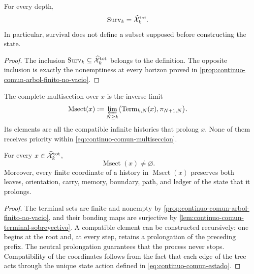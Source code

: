 \begin{theorem}
\label{thm:continuo-comun-total-superviviente}
For every depth,
\begin{equation}
\label{eq:continuo-comun-surv-igual-total}
 \operatorname{Surv}_k=\widehat{\mathcal X}^{\rm tot}_k.
\end{equation}
In particular, survival does not define a subset supposed before constructing the state.
\end{theorem}

\begin{proof}
The inclusion \(\operatorname{Surv}_k\subseteq
\widehat{\mathcal X}^{\rm tot}_k\) belongs to the definition.  The opposite
inclusion is exactly the nonemptiness at every horizon proved in
\cref{prop:continuo-comun-arbol-finito-no-vacio}.
\end{proof}

\begin{definition}
\label{def:continuo-comun-multiseccion}
The complete multisection over \(x\) is the inverse limit
\begin{equation}
\label{eq:continuo-comun-multiseccion}
 \operatorname{Msect}(x)
 :=\varprojlim_{N\geq k}
 \bigl(\operatorname{Term}_{k,N}(x),\pi_{N+1,N}\bigr).
\end{equation}
Its elements are all the compatible infinite histories that prolong
\(x\).  None of them receives priority within
\eqref{eq:continuo-comun-multiseccion}.
\end{definition}

\begin{theorem}
\label{thm:continuo-comun-multiseccion-no-vacia}
For every \(x\in\widehat{\mathcal X}^{\rm tot}_k\),
\begin{equation}
\label{eq:continuo-comun-multiseccion-no-vacia}
 \operatorname{Msect}(x)\neq\varnothing.
\end{equation}
Moreover, every finite coordinate of a history in
\(\operatorname{Msect}(x)\) preserves both leaves, orientation, carry,
memory, boundary, path, and ledger of the state that it prolongs.
\end{theorem}

\begin{proof}
The terminal sets are finite and nonempty by \cref{prop:continuo-comun-arbol-finito-no-vacio}, and their bonding maps are surjective by \cref{lem:continuo-comun-terminal-sobreyectivo}. A compatible element can be constructed recursively: one begins at the root and, at every step, retains a prolongation of the preceding prefix. The neutral prolongation guarantees that the process never stops. Compatibility of the coordinates follows from the fact that each edge of the tree acts through the unique state action defined in \eqref{eq:continuo-comun-estado}.
\end{proof}

